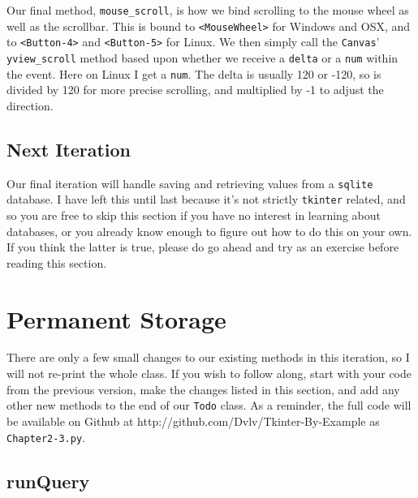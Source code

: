 \documentclass[a4paper,11pt,openany]{book}
\newcommand{\myGithub}{http://github.com/Dvlv/Tkinter-By-Example}
\begin{document}
Our final method, \lstinline[columns=fixed]{mouse_scroll}, is how we bind scrolling to the mouse wheel as well as the scrollbar. This is bound to \lstinline[columns=fixed]{<MouseWheel>} for Windows and OSX, and to \lstinline[columns=fixed]{<Button-4>} and \lstinline[columns=fixed]{<Button-5>} for Linux. We then simply call the \lstinline[columns=fixed]{Canvas}' \lstinline[columns=fixed]{yview_scroll} method based upon whether we receive a \lstinline[columns=fixed]{delta} or a \lstinline[columns=fixed]{num} within the event. Here on Linux I get a \lstinline[columns=fixed]{num}. The delta is usually 120 or -120, so is divided by 120 for more precise scrolling, and multiplied by -1 to adjust the direction.  

\subsection{Next Iteration}

Our final iteration will handle saving and retrieving values from a \lstinline[columns=fixed]{sqlite} database. I have left this until last because it's not strictly \lstinline[columns=fixed]{tkinter} related, and so you are free to skip this section if you have no interest in learning about databases, or you already know enough to figure out how to do this on your own. If you think the latter is true, please do go ahead and try as an exercise before reading this section. 

\newpage

\section{Permanent Storage}

There are only a few small changes to our existing methods in this iteration, so I will not re-print the whole class. If you wish to follow along, start with your code from the previous version, make the changes listed in this section, and add any other new methods to the end of our \lstinline[columns=fixed]{Todo} class. As a reminder, the full code will be available on Github at \myGithub{} as \lstinline[columns=fixed]{Chapter2-3.py}.



\newpage

\subsection{runQuery}
\end{document}
